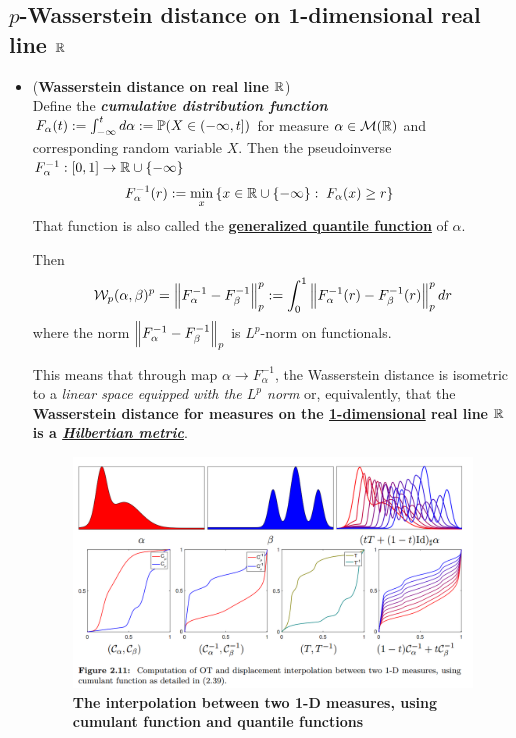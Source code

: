 \documentclass[11pt]{article}
\begin{document}
\subsection{$p$-Wasserstein distance on 1-dimensional real line ${\mathbb R}$}
\begin{itemize}
\item (\textbf{Wasserstein distance on real line} ${\mathbb R}$)\\
Define the \emph{\textbf{cumulative distribution function}} $F_{\alpha}(t):= \int_{-\infty}^{t}d\alpha := {\mathbb P}(X \in (-\infty, t])$ for measure $\alpha \in {\mathcal M}({\mathbb R})$ and corresponding random variable $X$. Then the pseudoinverse $F_{\alpha}^{-1}: [0,1] \rightarrow {\mathbb R}\cup\left\{-\infty\right\}$
\begin{align}
F_{\alpha}^{-1}(r) &:= \min_{x}\left\{x \in {\mathbb R}\cup\left\{-\infty\right\}: \; F_{\alpha}(x) \ge r\right\}\quad \label{eqn: quantile}
\end{align} That function is also called the \underline{\textbf{generalized quantile function}} of $\alpha$. 

Then
\begin{align}
{\mathcal W}_{p}(\alpha, \beta)^{p} = \left\|F_{\alpha}^{-1} - F_{\beta}^{-1}\right\|_{p}^{p} := \int_{0}^{1}\left\|F_{\alpha}^{-1}(r) - F_{\beta}^{-1}(r)\right\|_{p}^{p} dr \label{eqn: wass_dist_lp_general}
\end{align} where the norm $\left\|F_{\alpha}^{-1} - F_{\beta}^{-1}\right\|_{p}$ is $L^{p}$-norm on functionals. 

This means that through map $\alpha \rightarrow F_{\alpha}^{-1}$, the Wasserstein distance is isometric to a \emph{linear space equipped with the $L^p$ norm} or, equivalently, that the \textbf{Wasserstein distance for measures on the \underline{1-dimensional} real line ${\mathbb R}$ is a \underline{\emph{Hilbertian metric}}}.

\begin{figure}
\begin{minipage}[t]{1\linewidth}
  \centering
  \centerline{\includegraphics[scale = 0.3]{1d_wass_dist_opt_map.png}}
\end{minipage}
\caption{\footnotesize{\textbf{The interpolation between two 1-D measures, using cumulant function and quantile functions}}}
\label{fig: 1d_wass_dist_opt_map}
\end{figure}
\end{itemize}
\end{document}
